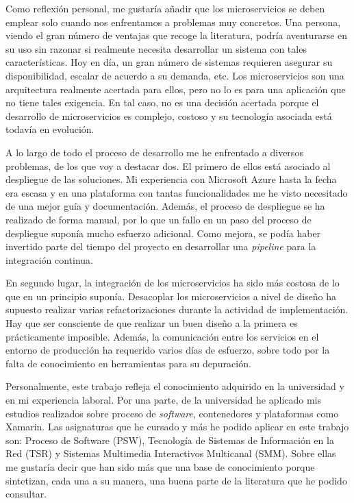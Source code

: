 \documentclass[11pt,spanish,listoffigures]{tfgetsinf}
\begin{document}
Como reflexión personal, me gustaría añadir que los microservicios se deben emplear solo cuando nos enfrentamos a problemas muy concretos. Una persona, viendo el gran número de ventajas que recoge la literatura, podría aventurarse en su uso sin razonar si realmente necesita desarrollar un sistema con tales características. Hoy en día, un gran número de sistemas requieren asegurar su disponibilidad, escalar de acuerdo a su demanda, etc. Los microservicios son una arquitectura realmente acertada para ellos, pero no lo es para una aplicación que no tiene tales exigencia. En tal caso, no es una decisión acertada porque el desarrollo de microservicios es complejo, costoso y su tecnología asociada está todavía en evolución.

A lo largo de todo el proceso de desarrollo me he enfrentado a diversos problemas, de los que voy a destacar dos. El primero de ellos está asociado al despliegue de las soluciones. Mi experiencia con Microsoft Azure hasta la fecha era escasa y en una plataforma con tantas funcionalidades me he visto necesitado de una mejor guía y documentación. Además, el proceso de despliegue se ha realizado de forma manual, por lo que un fallo en un paso del proceso de despliegue suponía mucho esfuerzo adicional. Como mejora, se podía haber invertido parte del tiempo del proyecto en desarrollar una \textit{pipeline} para la integración continua.

En segundo lugar, la integración de los microservicios ha sido más costosa de lo que en un principio suponía. Desacoplar los microservicios a nivel de diseño ha supuesto realizar varias refactorizaciones durante la actividad de implementación. Hay que ser consciente de que realizar un buen diseño a la primera es prácticamente imposible. Además, la comunicación entre los servicios en el entorno de producción ha requerido varios días de esfuerzo, sobre todo por la falta de conocimiento en herramientas para su depuración.

Personalmente, este trabajo refleja el conocimiento adquirido en la universidad y en mi experiencia laboral. Por una parte, de la universidad he aplicado mis estudios realizados sobre proceso de \textit{software}, contenedores y plataformas como Xamarin. Las asignaturas que he cursado y más he podido aplicar en este trabajo son: Proceso de Software (PSW), Tecnología de Sistemas de Información en la Red (TSR) y Sistemas Multimedia Interactivos Multicanal (SMM). Sobre ellas me gustaría decir que han sido más que una base de conocimiento porque sintetizan, cada una a su manera, una buena parte de la literatura que he podido consultar.
\end{document}
